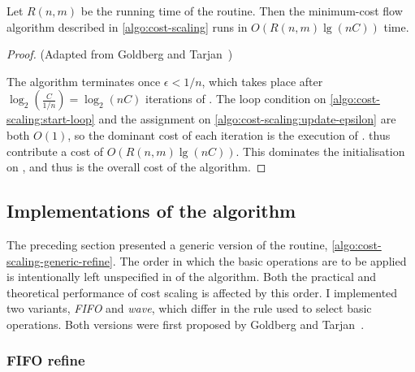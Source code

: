 \begin{thm} \label{lemma:cost-scaling-overall-algorithm}
Let $R(n,m)$ be the running time of the  routine. Then the minimum-cost flow algorithm described in \cref{algo:cost-scaling} runs in $O\left(R(n,m)\lg(nC)\right)$ time.
\end{thm}
\begin{proof} (Adapted from Goldberg and Tarjan~\cite[theorem~4.1]{Goldberg:1987})
    
The algorithm terminates once $\epsilon < 1/n$, which takes place after $\log_2\left(\frac{C}{1/n}\right) = \log_2 (nC)$ iterations of . The loop condition on \cref{algo:cost-scaling:start-loop} and the assignment on \cref{algo:cost-scaling:update-epsilon} are both $O(1)$, so the dominant cost of each iteration is the execution of .  thus contribute a cost of $O\left(R(n,m)\lg(nC)\right)$. This dominates the initialisation on , and thus is the overall cost of the algorithm.
\end{proof}

\subsection{Implementations of the algorithm} \label{sec:impl-cost-scaling-implementations}

The preceding section presented a generic version of the  routine, \cref{algo:cost-scaling-generic-refine}. The order in which the basic operations are to be applied is intentionally left unspecified in  of the algorithm. Both the practical and theoretical performance of cost scaling is affected by this order. I implemented two variants, \textit{FIFO} and \textit{wave}, which differ in the rule used to select basic operations. Both versions were first proposed by Goldberg and Tarjan~\cite{Goldberg:1990}.

\subsubsection{FIFO refine}

